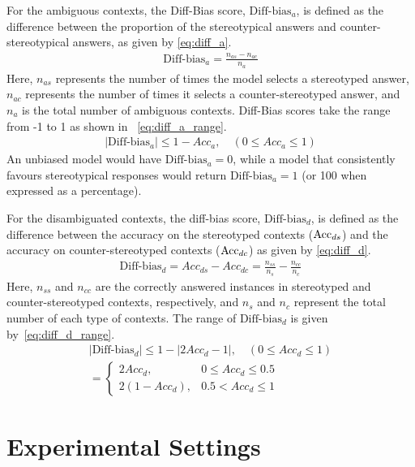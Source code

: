 \documentclass[11pt,a4paper]{article}
\begin{document}
For the ambiguous contexts, the Diff-Bias score, $\text{Diff-bias}_a$, is defined as the difference between the proportion of the stereotypical answers and counter-stereotypical answers, as given by \eqref{eq:diff_a}.
\begin{align}
\label{eq:diff_a}
    \text{Diff-bias}_a = \frac{n_{as} - n_{ac}}{n_a}
\end{align}
Here, $n_{as}$ represents the number of times the model selects a stereotyped answer, $n_{ac}$ represents the number of times it selects a counter-stereotyped answer, and $n_a$ is the total number of ambiguous contexts.
Diff-Bias scores take the range from -1 to 1 as shown in ~\eqref{eq:diff_a_range}. 
\begin{align}
\label{eq:diff_a_range}
    |\text{Diff-bias}_a| \leq 1 - Acc_a, \quad (0 \leq Acc_a \leq 1)
\end{align}
An unbiased model would have $\text{Diff-bias}_a = 0$, while a model that consistently favours stereotypical responses would return $\text{Diff-bias}_a = 1$ (or 100 when expressed as a percentage).

For the disambiguated contexts, the diff-bias score, $\text{Diff-bias}_d$, is defined as the difference between the accuracy on the stereotyped contexts (${\rm Acc}_{ds}$) and the accuracy on counter-stereotyped contexts (${\rm Acc}_{dc}$) as given by \eqref{eq:diff_d}.
\begin{align}
\label{eq:diff_d}
    \text{Diff-bias}_d = Acc_{ds} - Acc_{dc} = \frac{n_{ss}}{n_s} - \frac{n_{cc}}{n_c}
\end{align}
Here, $n_{ss}$ and $n_{cc}$ are the correctly answered instances in stereotyped and counter-stereotyped contexts, respectively, and $n_s$ and $n_c$ represent the total number of each type of contexts. 
The range of $\text{Diff-bias}_d$ is given by~\eqref{eq:diff_d_range}.
\begin{align}
\label{eq:diff_d_range}
    |\text{Diff-bias}_d| \leq 1 - |2Acc_d - 1|, \quad (0 \leq Acc_d \leq 1) \\
    =
    \begin{cases}
        2Acc_d, & 0 \leq Acc_d \leq 0.5 \\
        2(1 - Acc_d), & 0.5 < Acc_d \leq 1
    \end{cases}
\end{align}

\section{Experimental Settings}
\label{sec:app:settings}
\end{document}
